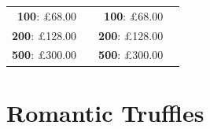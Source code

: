 \documentclass[11pt, english]{article}
\begin{document}
\begin{table}[h]
\begin{center}
\begin{tabular}{r|p{4cm}r|p{4cm}}
		\textbf{100}: \pounds68.00 & & \textbf{100}: \pounds68.00 & \\
		\textbf{200}: \pounds128.00 & & \textbf{200}: \pounds128.00 & \\
		\textbf{500}: \pounds300.00 & & \textbf{500}: \pounds300.00 & \\
	\end{tabular}
	\end{center}
	\end{table}

	\vspace{1cm}

\section{Romantic Truffles}
\end{document}
